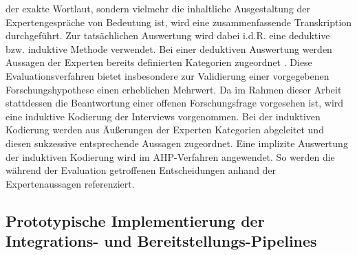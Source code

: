 der exakte Wortlaut, sondern vielmehr die inhaltliche Ausgestaltung der Expertengespräche von Bedeutung ist, wird eine zusammenfassende Transkription durchgeführt. Zur tatsächlichen Auswertung wird dabei i.d.R. eine deduktive bzw. induktive Methode verwendet. Bei einer deduktiven Auswertung werden Aussagen der Experten bereits definierten Kategorien zugeordnet \cite[244 ff.]{Hildebrandt.2015}. Diese Evaluationsverfahren bietet insbesondere zur Validierung einer vorgegebenen Forschungshypothese einen erheblichen Mehrwert. Da im Rahmen dieser Arbeit stattdessen die Beantwortung einer offenen Forschungsfrage vorgesehen ist, wird eine induktive Kodierung der Interviews vorgenommen. Bei der induktiven Kodierung werden aus Äußerungen der Experten Kategorien abgeleitet und diesen sukzessive entsprechende Aussagen zugeordnet. Eine implizite Auswertung der induktiven Kodierung wird im AHP-Verfahren angewendet. So werden die während der Evaluation getroffenen Entscheidungen anhand der Expertenaussagen referenziert.


\subsection{Prototypische Implementierung der Integrations- und Bereitstellungs-Pipelines}

